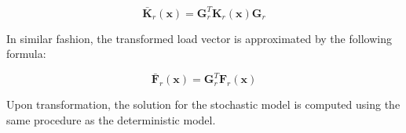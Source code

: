 \documentclass[../DomainDecomposition.tex]{subfiles}
\begin{document}
\begin{equation}
    \bar{\mathbf{K}}_{r} \left(\mathbf{x}\right) 
    =
    \mathbf{G}_{r}^{T} 
    \mathbf{K}_{r} \left(\mathbf{x}\right) 
    \mathbf{G}_{r} 
\end{equation}

In similar fashion, the transformed load vector is approximated by the following formula: 

\begin{equation}
    \bar{\mathbf{F}}_{r} \left(\mathbf{x}\right) 
    =
    \mathbf{G}_{r}^{T} 
    \mathbf{F}_{r} \left(\mathbf{x}\right) 
\end{equation}

Upon transformation, the solution for the stochastic model is computed using the same procedure as the deterministic model. 
\end{document}
